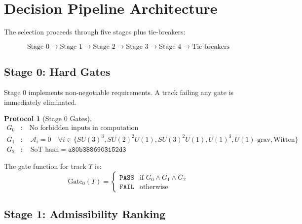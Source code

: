 \documentclass[11pt,a4paper]{article}
\newtheorem{protocol}{Protocol}[section]
\begin{document}
\section{Decision Pipeline Architecture}
\label{sec:pipeline}

The selection proceeds through five stages plus tie-breakers:

\begin{equation}
\label{eq:pipeline-stages}
\text{Stage 0} \to \text{Stage 1} \to \text{Stage 2} \to \text{Stage 3} \to \text{Stage 4} \to \text{Tie-breakers}
\end{equation}

\subsection{Stage 0: Hard Gates}
\label{subsec:stage0}

Stage 0 implements non-negotiable requirements. A track failing any gate
is immediately eliminated.

\begin{protocol}[Stage 0 Gates]
\label{prot:stage0}
\begin{align}
\label{eq:gate-g0}
G_0&: \quad \text{No forbidden inputs in computation} \\
\label{eq:gate-g1}
G_1&: \quad \mathcal{A}_i = 0 \quad \forall i \in \{SU(3)^3, SU(2)^2U(1), SU(3)^2U(1), U(1)^3, U(1)\text{-grav}, \text{Witten}\} \\
\label{eq:gate-g2}
G_2&: \quad \text{SoT hash} = \texttt{a80b3886903152d3}
\end{align}
\end{protocol}

The gate function for track $T$ is:
\begin{equation}
\label{eq:gate-function}
\text{Gate}_0(T) = \begin{cases}
\texttt{PASS} & \text{if } G_0 \land G_1 \land G_2 \\
\texttt{FAIL} & \text{otherwise}
\end{cases}
\end{equation}

\subsection{Stage 1: Admissibility Ranking}
\label{subsec:stage1}
\end{document}
